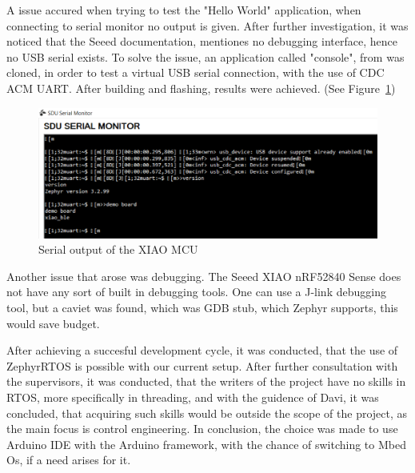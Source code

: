 A issue accured when trying to test the "Hello World" application, when connecting to serial monitor no output is given.
After further investigation, it was noticed that the Seeed documentation, mentiones no debugging interface, hence no USB serial exists.
To solve the issue, an application called "console", from  was cloned, in order to test a virtual USB serial connection, with the use of CDC ACM UART. \cite{gitZephyr}
After building and flashing, results were achieved. (See Figure~\ref{fig:serial})

\begin{figure}[H]
    \centering
    \includegraphics[scale = 0.7]{pictures/serial_monitor.png}
    \caption{Serial output of the XIAO MCU}
    \label{fig:serial}
\end{figure}

Another issue that arose was debugging. The Seeed XIAO nRF52840 Sense does not have any sort of built in debugging tools. \cite{wikiSeeed}
One can use a J-link debugging tool, but a caviet was found, which was GDB stub, which Zephyr supports, this would save budget. \cite{docsZephyr}

After achieving a succesful development cycle, it was conducted, that the use of ZephyrRTOS is possible with our current setup.
After further consultation with the supervisors, it was conducted, that the writers of the project have no skills in RTOS, more specifically in threading, and with the guidence of Davi, it was concluded, that acquiring such skills would be outside the scope of the project, as the main focus is control engineering.
In conclusion, the choice was made to use Arduino IDE with the Arduino framework, with the chance of switching to Mbed Os, if a need arises for it.